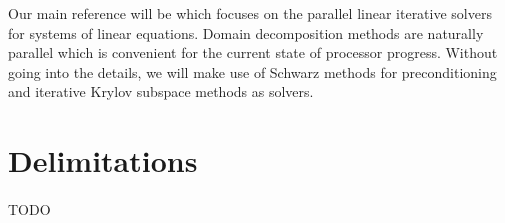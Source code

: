 Our main reference will be \cite{dolean_domain_2015} which focuses on the parallel linear iterative solvers for systems of linear equations.
Domain decomposition methods are naturally parallel which is convenient for the current state of processor progress.
Without going into the details, we will make use of Schwarz methods for preconditioning and iterative Krylov subspace methods as solvers.

\section{Delimitations}

\paragraph{}
TODO
